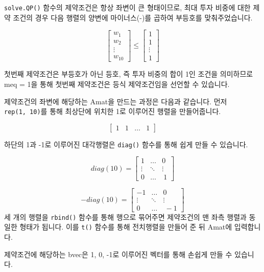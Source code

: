 \documentclass[12pt,]{book}
\newenvironment{Shaded}{\begin{snugshade}}{\end{snugshade}}
\newcommand{\KeywordTok}[1]{\textcolor[rgb]{0.13,0.29,0.53}{\textbf{#1}}}
\newcommand{\NormalTok}[1]{#1}
\newcommand{\OperatorTok}[1]{\textcolor[rgb]{0.81,0.36,0.00}{\textbf{#1}}}
\newcommand{\StringTok}[1]{\textcolor[rgb]{0.31,0.60,0.02}{#1}}
\begin{document}
\texttt{solve.QP()} 함수의 제약조건은 항상 좌변이 큰 형태이므로, 최대 투자 비중에 대한 제약 조건의 경우 다음 행렬의 양변에 마이너스(-)를 곱하여 부등호를 맞춰주었습니다.

\[\begin{bmatrix} w_1 \\ w_2 \\ \vdots \\ w_{10}  \end{bmatrix} \le
\begin{bmatrix} 1 \\ 1 \\ \vdots \\ 1 \end{bmatrix}\]

첫번째 제약조건은 부등호가 아닌 등호, 즉 투자 비중의 합이 1인 조건을 의미하므로 meq = 1을 통해 첫번째 제약조건은 등식 제약조건임을 선언할 수 있습니다.

제약조건의 좌변에 해당하는 Amat을 만드는 과정은 다음과 같습니다. 먼저 \texttt{rep(1,\ 10)}를 통해 최상단에 위치한 1로 이루어진 행렬을 만들어줍니다.

\[\begin{bmatrix} 1 & 1 & \dots & 1 \end{bmatrix}\]

하단의 1과 -1로 이루어진 대각행렬은 \texttt{diag()} 함수를 통해 쉽게 만들 수 있습니다.

\[ diag(10) = \begin{bmatrix} 1 & \dots & 0 \\ \vdots & \ddots & \vdots \\ 0 & \dots &\ 1\end{bmatrix}\]

\[ -diag(10) = \begin{bmatrix} -1 & \dots & 0 \\ \vdots & \ddots & \vdots \\ 0 & \dots &\ -1\end{bmatrix}\]
세 개의 행렬을 \texttt{rbind()} 함수를 통해 행으로 묶어주면 제약조건의 맨 좌측 행렬과 동일한 형태가 됩니다. 이를 \texttt{t()} 함수를 통해 전치행렬을 만들어 준 뒤 Amat에 입력합니다.

제약조건에 해당하는 bvec은 1, 0, -1로 이루어진 벡터를 통해 손쉽게 만들 수 있습니다.

\begin{Shaded}
\end{Shaded}
\end{document}
